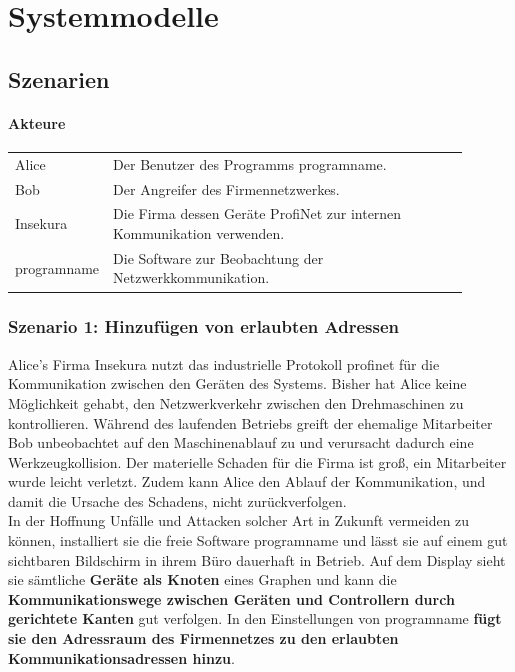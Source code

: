 \chapter{Systemmodelle}



\section{Szenarien}

\subsubsection*{Akteure}

\begin{tabular}{lp{0.9\linewidth}}

Alice & Der Benutzer des Programms \gls{programname}. \\

Bob & Der Angreifer des Firmennetzwerkes. \\

Insekura & Die Firma dessen Geräte ProfiNet zur internen Kommunikation verwenden. \\

\gls{programname} & Die Software zur Beobachtung der Netzwerkkommunikation.\\

\end{tabular}

\subsection{Szenario 1: Hinzufügen von erlaubten Adressen}

Alice's Firma Insekura nutzt das industrielle Protokoll \gls{profinet} für die Kommunikation zwischen den Geräten des Systems. Bisher hat Alice keine Möglichkeit gehabt, den Netzwerkverkehr zwischen den Drehmaschinen zu kontrollieren. Während des laufenden Betriebs greift der ehemalige Mitarbeiter Bob unbeobachtet auf den Maschinenablauf zu und verursacht dadurch eine Werkzeugkollision. Der materielle Schaden für die Firma ist groß, ein Mitarbeiter wurde leicht verletzt. Zudem kann Alice den Ablauf der Kommunikation, und damit die Ursache des Schadens, nicht zurückverfolgen.\\
In der Hoffnung Unfälle und Attacken solcher Art in Zukunft vermeiden zu können, installiert sie die freie Software \gls{programname} und lässt sie auf einem gut sichtbaren Bildschirm in ihrem Büro dauerhaft in Betrieb. Auf dem Display sieht sie sämtliche \textbf{Geräte als Knoten} eines Graphen und kann die \textbf{Kommunikationswege zwischen Geräten und Controllern durch gerichtete Kanten} gut verfolgen. In den Einstellungen von \gls{programname} \textbf{fügt sie den Adressraum des Firmennetzes zu den erlaubten Kommunikationsadressen hinzu}.

